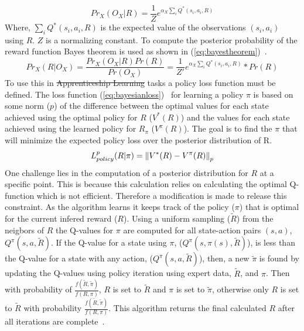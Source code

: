 \documentclass[12pt,american]{report}
\providecommand{\DIFaddtex}[1]{{\protect\color{blue}\uwave{#1}}} %
\providecommand{\DIFdeltex}[1]{{\protect\color{red}\sout{#1}}}                      %
\providecommand{\DIFaddbegin}{} %
\providecommand{\DIFaddend}{} %
\providecommand{\DIFdelbegin}{} %
\providecommand{\DIFdelend}{} %
\providecommand{\DIFadd}[1]{\texorpdfstring{\DIFaddtex{#1}}{#1}} %
\providecommand{\DIFdel}[1]{\texorpdfstring{\DIFdeltex{#1}}{}} %
\newcommand{\DIFscaledelfig}{0.5}
\newlength{\DIFdelgraphicswidth} %
\newlength{\DIFdelgraphicsheight} %
\newcommand{\DIFaddincludegraphics}[2][]{{\color{blue}\fbox{\DIFOincludegraphics[#1]{#2}}}} %
\newcommand{\DIFdelincludegraphics}[2][]{%
\sbox{\DIFdelgraphicsbox}{\DIFOincludegraphics[#1]{#2}}%
\settoboxwidth{\DIFdelgraphicswidth}{\DIFdelgraphicsbox} %
\settoboxtotalheight{\DIFdelgraphicsheight}{\DIFdelgraphicsbox} %
\scalebox{\DIFscaledelfig}{%
\parbox[b]{\DIFdelgraphicswidth}{\usebox{\DIFdelgraphicsbox}\\[-\baselineskip] \rule{\DIFdelgraphicswidth}{0em}}\llap{\resizebox{\DIFdelgraphicswidth}{\DIFdelgraphicsheight}{%
\setlength{\unitlength}{\DIFdelgraphicswidth}%
\begin{picture}(1,1)%
\thicklines\linethickness{2pt} %
{\color[rgb]{1,0,0}\put(0,0){\framebox(1,1){}}}%
{\color[rgb]{1,0,0}\put(0,0){\line( 1,1){1}}}%
{\color[rgb]{1,0,0}\put(0,1){\line(1,-1){1}}}%
\end{picture}%
}\hspace*{3pt}}} %
} %
\DeclareRobustCommand{\DIFaddbegin}{\DIFOaddbegin \let\includegraphics\DIFaddincludegraphics} %
\DeclareRobustCommand{\DIFaddend}{\DIFOaddend \let\includegraphics\DIFOincludegraphics} %
\DeclareRobustCommand{\DIFdelbegin}{\DIFOdelbegin \let\includegraphics\DIFdelincludegraphics} %
\DeclareRobustCommand{\DIFdelend}{\DIFOaddend \let\includegraphics\DIFOincludegraphics} %
\begin{document}
\begin{equation}
            \label{eq:bayseianliklihood}
            Pr_X(O_X|R) =  \frac{1}{Z}e^{\alpha_X\sum_{i}^{}Q^*(s_i,a_i,R)}%
        \end{equation}
Where, $\sum_{i}^{}Q^*(s_i,a_i,R)$ is the expected value of the observations $(s_i,a_i)$ using $R$. $Z$ is a normalizing constant. To compute the posterior probability of the reward function Bayes theorem is used as shown in (\ref{eq:bayestheorem})~\cite{ramachandran2007bayesian}.
\begin{equation}
            \label{eq:bayestheorem}
            Pr_X(R|O_X) =  \frac{Pr_X(O_X|R)Pr(R)}{Pr(O_X)}= \frac{1}{Z'}e^{\alpha_X\sum_{i}^{}Q^*(s_i,a_i,R)}*Pr(R)%
        \end{equation}
To use this in \DIFdelbegin \DIFdel{Apprenticeship Learning }\DIFdelend \DIFaddbegin \DIFadd{apprenticeship learning }\DIFaddend tasks a policy loss function must be defined. The loss function (\ref{eq:bayesianloss})~\cite{ramachandran2007bayesian} for learning a policy $\pi$ is based on some norm ($p$) of the difference between the optimal values for each state achieved using the optimal policy for $R$ ($V^*(R)$) and the values for each state achieved using the learned policy for $R_{\pi}$ ($V^\pi(R)$).  The goal is to find the $\pi$ that will minimize the expected policy loss over the posterior distribution of R.  
\begin{equation}
            \label{eq:bayesianloss}
            L_{policy}^{p}(R|\pi)=\norm{V^*(R)-V^\pi(R)}_p%
        \end{equation}
One challenge lies in the computation of a posterior distribution for $R$ at a specific point.  This is because this calculation relies on calculating the optimal Q-function which is not efficient.  Therefore a modification is made to release this constraint.  As the algorithm learns it keeps track of the policy ($\pi$) that is optimal for the current infered reward ($R$).  Using a uniform sampling ($\tilde{R}$) from the neigbors of $R$ the Q-values for $\pi$ are computed for all state-action pairs $(s,a)$, $Q^\pi(s,a,\tilde{R})$. If the Q-value for a state using $\pi$, ($Q^\pi(s,\pi(s),\tilde{R})$), is less than the Q-value for a state with any action, ($Q^\pi(s,a,\tilde{R})$), then, a new $\tilde{\pi}$ is found by updating the Q-values using policy iteration using expert data, $\tilde{R}$, and $\pi$. Then with probability of $\frac{f(\tilde{R},\tilde{\pi})}{f(R,\pi)}$, $R$ is set to $\tilde{R}$ and $\pi$ is set to $\tilde{\pi}$, otherwise only $R$ is set to $\tilde{R}$  with probability $\frac{f(\tilde{R},\tilde{\pi})}{f(R,\pi)}$.  This algorithm returns the final calculated $R$ after all iterations are complete~\cite{ramachandran2007bayesian}.
\end{document}
